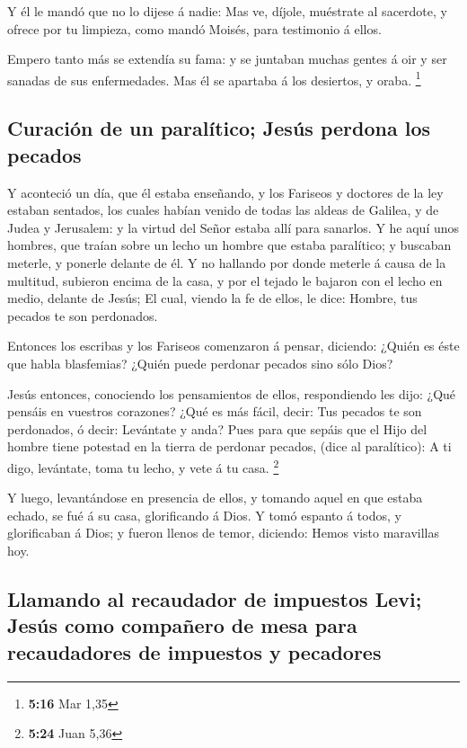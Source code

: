 Y él le mandó que no lo dijese á nadie: Mas ve, díjole,
muéstrate al sacerdote, y ofrece por tu limpieza, como mandó Moisés,
para testimonio á ellos.

 Empero tanto más se extendía su fama: y se juntaban muchas
gentes á oir y ser sanadas de sus enfermedades.  Mas él se
apartaba á los desiertos, y oraba. \footnote{\textbf{5:16} Mar 1,35}

\hypertarget{curaciuxf3n-de-un-paraluxedtico-jesuxfas-perdona-los-pecados}{%
\subsection{Curación de un paralítico; Jesús perdona los
pecados}\label{curaciuxf3n-de-un-paraluxedtico-jesuxfas-perdona-los-pecados}}

 Y aconteció un día, que él estaba enseñando, y los
Fariseos y doctores de la ley estaban sentados, los cuales habían venido
de todas las aldeas de Galilea, y de Judea y Jerusalem: y la virtud del
Señor estaba allí para sanarlos.  Y he aquí unos hombres,
que traían sobre un lecho un hombre que estaba paralítico; y buscaban
meterle, y ponerle delante de él.  Y no hallando por donde
meterle á causa de la multitud, subieron encima de la casa, y por el
tejado le bajaron con el lecho en medio, delante de Jesús; 
El cual, viendo la fe de ellos, le dice: Hombre, tus pecados te son
perdonados.

 Entonces los escribas y los Fariseos comenzaron á pensar,
diciendo: ¿Quién es éste que habla blasfemias? ¿Quién puede perdonar
pecados sino sólo Dios?

 Jesús entonces, conociendo los pensamientos de ellos,
respondiendo les dijo: ¿Qué pensáis en vuestros corazones? 
¿Qué es más fácil, decir: Tus pecados te son perdonados, ó decir:
Levántate y anda?  Pues para que sepáis que el Hijo del
hombre tiene potestad en la tierra de perdonar pecados, (dice al
paralítico): A ti digo, levántate, toma tu lecho, y vete á tu casa.
\footnote{\textbf{5:24} Juan 5,36}

 Y luego, levantándose en presencia de ellos, y tomando
aquel en que estaba echado, se fué á su casa, glorificando á Dios.
 Y tomó espanto á todos, y glorificaban á Dios; y fueron
llenos de temor, diciendo: Hemos visto maravillas hoy.

\hypertarget{llamando-al-recaudador-de-impuestos-levi-jesuxfas-como-compauxf1ero-de-mesa-para-recaudadores-de-impuestos-y-pecadores}{%
\subsection{Llamando al recaudador de impuestos Levi; Jesús como
compañero de mesa para recaudadores de impuestos y
pecadores}\label{llamando-al-recaudador-de-impuestos-levi-jesuxfas-como-compauxf1ero-de-mesa-para-recaudadores-de-impuestos-y-pecadores}}

